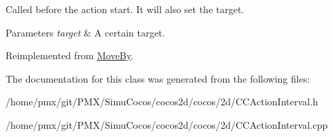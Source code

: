 Called before the action start. It will also set the target.


\begin{DoxyParams}{Parameters}
{\em target} & A certain target. \\
\hline
\end{DoxyParams}


Reimplemented from \hyperlink{classMoveBy_ab83e2fe86e82757fa11cb734a4971a5f}{Move\+By}.



The documentation for this class was generated from the following files\+:\begin{DoxyCompactItemize}
\item 
/home/pmx/git/\+P\+M\+X/\+Simu\+Cocos/cocos2d/cocos/2d/C\+C\+Action\+Interval.\+h\item 
/home/pmx/git/\+P\+M\+X/\+Simu\+Cocos/cocos2d/cocos/2d/C\+C\+Action\+Interval.\+cpp\end{DoxyCompactItemize}

